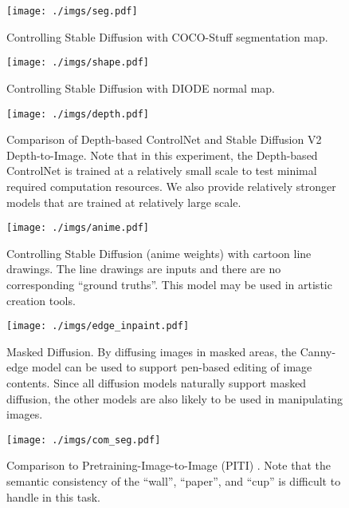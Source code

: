 \documentclass{article}
\begin{document}
\begin{figure}
	\centering
	\texttt{[image: ./imgs/seg.pdf]}
	\caption{Controlling Stable Diffusion with COCO-Stuff \cite{1612.03716} segmentation map.}
	\label{fig:coco} 
\end{figure}

\begin{figure}
	\centering
	\texttt{[image: ./imgs/shape.pdf]}
	\caption{Controlling Stable Diffusion with DIODE \cite{diode_dataset} normal map.}
	\label{fig:normal} 
\end{figure}

\begin{figure}
	\centering
	\texttt{[image: ./imgs/depth.pdf]}
	\caption{Comparison of Depth-based ControlNet and Stable Diffusion V2 Depth-to-Image. Note that in this experiment, the Depth-based ControlNet is trained at a relatively small scale to test minimal required computation resources. We also provide relatively stronger models that are trained at relatively large scale.}
	\label{fig:depth} 
\end{figure}

\begin{figure}
	\centering
	\texttt{[image: ./imgs/anime.pdf]}
	\caption{Controlling Stable Diffusion (anime weights) with cartoon line drawings. The line drawings are inputs and there are no corresponding ``ground truths''. This model may be used in artistic creation tools.}
	\label{fig:anime} 
\end{figure}

\begin{figure}
	\centering
	\texttt{[image: ./imgs/edge\_inpaint.pdf]}
	\caption{Masked Diffusion. By diffusing images in masked areas, the Canny-edge model can be used to support pen-based editing of image contents. Since all diffusion models naturally support masked diffusion, the other models are also likely to be used in manipulating images.}
	\label{fig:edge_inpaint} 
\end{figure}

\begin{figure}
	\centering
	\texttt{[image: ./imgs/com\_seg.pdf]}
	\caption{Comparison to Pretraining-Image-to-Image (PITI) \cite{2205.12952}. Note that the semantic consistency of the ``wall'', ``paper'', and ``cup'' is difficult to handle in this task.}
	\label{fig:piti} 
\end{figure}
\end{document}
